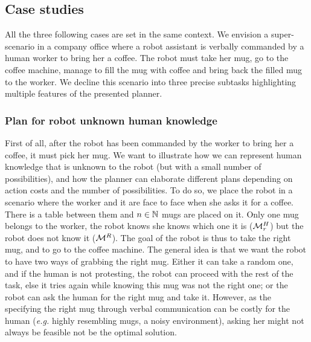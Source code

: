\documentclass[a4paper,11pt,twoside]{StyleThese}
\begin{document}
\subsection{Case studies}
All the three following cases are set in the same context. We envision a super-scenario in a company office where a robot assistant is verbally commanded by a human worker to bring her a coffee. The robot must take her mug, go to the coffee machine, manage to fill the mug with coffee and bring back the filled mug to the worker.
We decline this scenario into three precise subtasks highlighting multiple features of the presented planner.
\subsubsection{Plan for robot unknown human knowledge}
First of all, after the robot has been commanded by the worker to bring her a coffee, it must pick her mug. We want to illustrate how we can represent human knowledge that is unknown to the robot (but with a small number of possibilities), and how the planner can elaborate different plans depending on action costs and the number of possibilities. To do so, we place the robot in a scenario where the worker and it are face to face when she asks it for a coffee. There is a table between them and $n \in \mathbb{N}$ mugs are placed on it. Only one mug belongs to the worker, the robot knows she knows which one it is ($\mathcal{M}^H_r$) but the robot does not know it ($\mathcal{M}^R$). The goal of the robot is thus to take the right mug, and to go to the coffee machine. The general idea is that we want the robot to have two ways of grabbing the right mug. Either it can take a random one, and if the human is not protesting, the robot can proceed with the rest of the task, else it tries again while knowing this mug was not the right one; or the robot can ask the human for the right mug and take it. However, as the specifying the right mug through verbal communication can be costly for the human (\textit{e.g.} highly resembling mugs, a noisy environment), asking her might not always be feasible not be the optimal solution.
\end{document}
